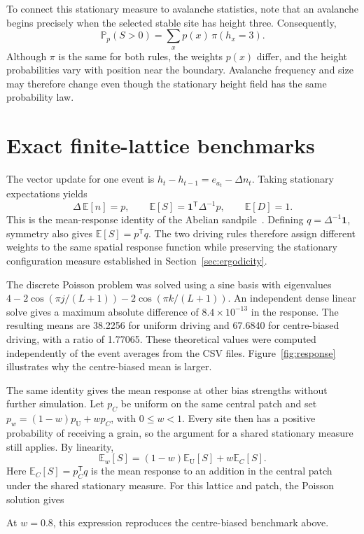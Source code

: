 \documentclass[11pt,a4paper,oneside]{report}
\newcommand{\E}{\mathbb{E}}
\newcommand{\Prob}{\mathbb{P}}
\newcommand{\one}{\mathbf{1}}
\newcommand{\U}{\mathrm{U}}
\numberwithin{equation}{chapter}
\begin{document}
To connect this stationary measure to avalanche statistics, note that an avalanche begins precisely when the selected stable site has height three. Consequently,
\begin{equation}
 \Prob_p(S>0)=\sum_x p(x)\,\pi(h_x=3).
 \label{eq:trigger}
\end{equation}
Although $\pi$ is the same for both rules, the weights $p(x)$ differ, and the height probabilities vary with position near the boundary. Avalanche frequency and size may therefore change even though the stationary height field has the same probability law.

\clearpage
\section{Exact finite-lattice benchmarks}
\label{sec:benchmarks}
The vector update for one event is $h_t-h_{t-1}=e_{a_t}-\Delta n_t$. Taking stationary expectations yields
\begin{equation}
 \Delta\,\E[n]=p,\qquad
 \E[S]=\one^{\mathsf T}\Delta^{-1}p,\qquad
 \E[D]=1.
 \label{eq:theory}
\end{equation}
This is the mean-response identity of the Abelian sandpile~\cite{dhar1990,dhar1999}. Defining $q=\Delta^{-1}\one$, symmetry also gives $\E[S]=p^{\mathsf T}q$. The two driving rules therefore assign different weights to the same spatial response function while preserving the stationary configuration measure established in Section~\ref{sec:ergodicity}.

The discrete Poisson problem was solved using a sine basis with eigenvalues
$4-2\cos(\pi j/(L+1))-2\cos(\pi k/(L+1))$. An independent dense linear solve gives a maximum absolute difference of $8.4\times10^{-13}$ in the response. The resulting means are 38.2256 for uniform driving and 67.6840 for centre-biased driving, with a ratio of 1.77065. These theoretical values were computed independently of the event averages from the CSV files. Figure~\ref{fig:response} illustrates why the centre-biased mean is larger.

The same identity gives the mean response at other bias strengths without further simulation. Let $p_C$ be uniform on the same central patch and set $p_w=(1-w)p_\U+wp_C$, with $0\leq w<1$. Every site then has a positive probability of receiving a grain, so the argument for a shared stationary measure still applies. By linearity,
\begin{equation}
 \E_w[S]=(1-w)\E_\U[S]+w\E_C[S].
 \label{eq:linearidentity}
\end{equation}
Here $\E_C[S]=p_C^{\mathsf T}q$ is the mean response to an addition in the central patch under the shared stationary measure. For this lattice and patch, the Poisson solution gives

At $w=0.8$, this expression reproduces the centre-biased benchmark above.

\FloatBarrier
\end{document}
